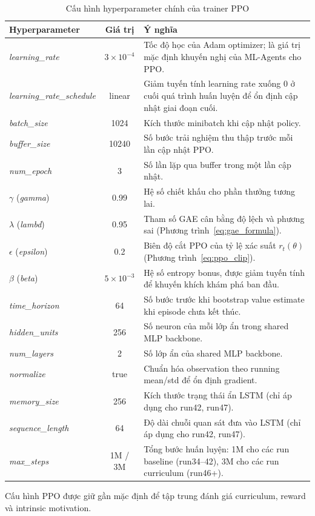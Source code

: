 \begin{table}[H]
    \centering
    \small
    \caption{Cấu hình hyperparameter chính của trainer PPO}
    \label{tab:ppo_hyperparams}
    \begin{tabular}{|p{4.0cm}|c|p{7.2cm}|}
        \hline
        \textbf{Hyperparameter} & \textbf{Giá trị} & \textbf{Ý nghĩa} \\
        \hline
        \emph{learning\_rate}      & $3{\times}10^{-4}$ & Tốc độ học của Adam optimizer; là giá trị mặc định khuyến nghị của ML-Agents cho PPO. \\
        \hline
        \emph{learning\_rate\_schedule} & linear & Giảm tuyến tính learning rate xuống 0 ở cuối quá trình huấn luyện để ổn định cập nhật giai đoạn cuối. \\
        \hline
        \emph{batch\_size}         & 1024  & Kích thước minibatch khi cập nhật policy. \\
        \hline
        \emph{buffer\_size}        & 10240 & Số bước trải nghiệm thu thập trước mỗi lần cập nhật PPO. \\
        \hline
        \emph{num\_epoch}          & 3     & Số lần lặp qua buffer trong một lần cập nhật. \\
        \hline
        $\gamma$ (\emph{gamma})    & 0.99  & Hệ số chiết khấu cho phần thưởng tương lai. \\
        \hline
        $\lambda$ (\emph{lambd})   & 0.95  & Tham số GAE cân bằng độ lệch và phương sai (Phương trình~\ref{eq:gae_formula}). \\
        \hline
        $\epsilon$ (\emph{epsilon})& 0.2   & Biên độ cắt PPO của tỷ lệ xác suất $r_t(\theta)$ (Phương trình~\ref{eq:ppo_clip}). \\
        \hline
        $\beta$ (\emph{beta})      & $5{\times}10^{-3}$ & Hệ số entropy bonus, được giảm tuyến tính để khuyến khích khám phá ban đầu. \\
        \hline
        \emph{time\_horizon}       & 64    & Số bước trước khi bootstrap value estimate khi episode chưa kết thúc. \\
        \hline
        \emph{hidden\_units}       & 256   & Số neuron của mỗi lớp ẩn trong shared MLP backbone. \\
        \hline
        \emph{num\_layers}         & 2     & Số lớp ẩn của shared MLP backbone. \\
        \hline
        \emph{normalize}           & true  & Chuẩn hóa observation theo running mean/std để ổn định gradient. \\
        \hline
        \emph{memory\_size}        & 256   & Kích thước trạng thái ẩn LSTM (chỉ áp dụng cho run42, run47). \\
        \hline
        \emph{sequence\_length}    & 64    & Độ dài chuỗi quan sát đưa vào LSTM (chỉ áp dụng cho run42, run47). \\
        \hline
        \emph{max\_steps}          & 1M / 3M & Tổng bước huấn luyện: 1M cho các run baseline (run34--42), 3M cho các run curriculum (run46+). \\
        \hline
    \end{tabular}
\end{table}

Cấu hình PPO được giữ gần mặc định để tập trung đánh giá curriculum, reward và intrinsic motivation.
